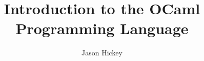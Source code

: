 \documentclass{book}
\title{Introduction to the OCaml Programming Language}
\author{Jason Hickey}
\begin{document}
\maketitle
\tableofcontents

\sloppy






\printindex
\end{document}

